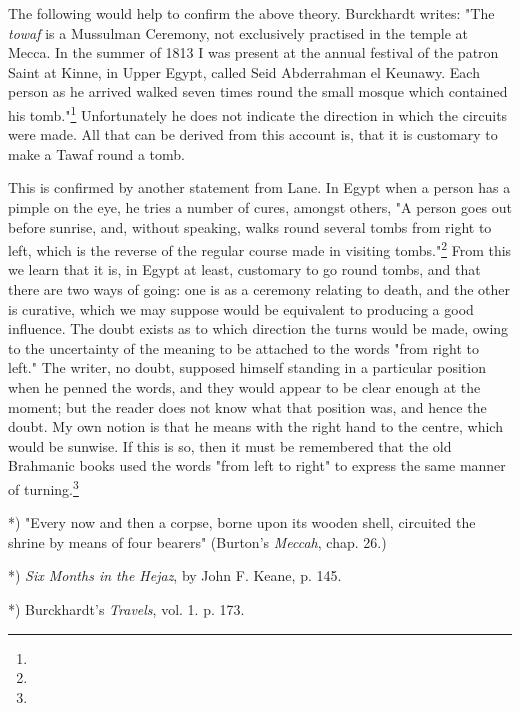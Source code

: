 \documentclass[a4paper, 11pt, oneside, polutonikogreek, english]{article}
\begin{document}
The following would help to confirm the above theory. Burckhardt writes: "The \emph{towaf} is a Mussulman Ceremony, not exclusively practised in the temple at Mecca. In the summer of 1813 I was present at the annual festival of the patron Saint at Kinne, in Upper Egypt, called Seid Abderrahman el Keunawy. Each person as he arrived walked seven times round the small mosque which contained his tomb."\footnote{} Unfortunately he does not indicate the direction in which the circuits were made. All that can be derived from this account is, that it is customary to make a Tawaf round a tomb.

This is confirmed by another statement from Lane. In Egypt when a person has a pimple on the eye, he tries a number of cures, amongst others, "A person goes out before sunrise, and, without speaking, walks round several tombs from right to left, which is the reverse of the regular course made in visiting tombs."\footnote{} From this we learn that it is, in Egypt at least, customary to go round tombs, and that there are two ways of going: one is as a ceremony relating to death, and the other is curative, which we may suppose would be equivalent to producing a good influence. The doubt exists as to which direction the turns would be made, owing to the uncertainty of the meaning to be attached to the words "from right to left." The writer, no doubt, supposed himself standing in a particular position when he penned the words, and they would appear to be clear enough at the moment; but the reader does not know what that position was, and hence the doubt. My own notion is that he means with the right hand to the centre, which would be sunwise. If this is so, then it must be remembered that the old Brahmanic books used the words "from left to right" to express the same manner of turning.\footnote{}

*) "Every now and then a corpse, borne upon its wooden shell, circuited the shrine by means of four bearers" (Burton's \emph{Meccah}, chap. 26.)

*) \emph{Six Months in the Hejaz}, by John F. Keane, p. 145.

*) Burckhardt's \emph{Travels}, vol. 1. p. 173.
\end{document}
